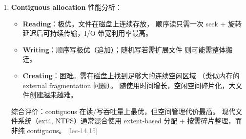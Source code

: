 \documentclass[11pt,a4paper]{article}
\newcommand{\lec}[1]{\textcolor{gray}{[lec-#1]}}
\begin{document}
\begin{enumerate}[label=(\alph*),leftmargin=*]
  \item \textbf{Contiguous allocation} 性能分析：

        \begin{itemize}[nosep]
          \item \textbf{Reading}：极优。文件在磁盘上连续存放，
                顺序读只需一次 seek + 旋转延迟后可持续传输，I/O 带宽利用率最高。
          \item \textbf{Writing}：顺序写极优（追加）；随机写若需扩展文件
                则可能需整体搬迁。
          \item \textbf{Creating}：困难。需在磁盘上找到足够大的连续空闲区域
                （类似内存的 external fragmentation 问题）。
                随使用时间增长，空闲空间碎片化，大文件创建越来越难。
        \end{itemize}

        综合评价：contiguous 在读/写吞吐量上最优，但空间管理代价最高。
        现代文件系统（ext4, NTFS）通常混合使用 extent-based 分配 +
        按需碎片整理，而非纯 contiguous。 \lec{14,15}

\end{enumerate}
\end{document}
